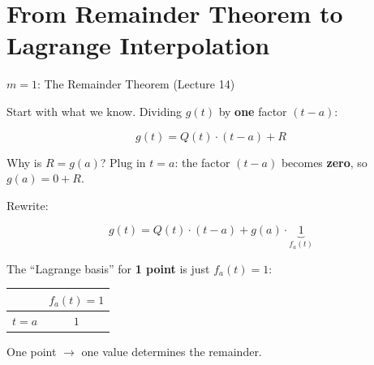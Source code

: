 \documentclass[10pt]{beamer}
\theoremstyle{definition}
\newcommand{\x}[1]{\alert{\textbf{#1}}}
\begin{document}
\section{From Remainder Theorem to Lagrange Interpolation}


\begin{frame}{$m = 1$: The Remainder Theorem (Lecture 14)}

Start with what we know. Dividing $g(t)$ by \x{one} factor $(t - a)$:

$$g(t) = Q(t)\cdot(t - a) + R$$

\vfill

Why is $R = g(a)$? \; Plug in $t = a$: the factor $(t-a)$ becomes \x{zero}, so $g(a) = 0 + R$.

\vfill\pause

Rewrite:

$$g(t) = Q(t)\cdot(t - a) + g(a) \cdot \underbrace{1}_{f_a(t)}$$

\vfill

The ``Lagrange basis'' for \x{1 point} is just $f_a(t) = 1$:

\begin{center}
\renewcommand{\arraystretch}{1.3}
\begin{tabular}{c|c}
 & $f_a(t) = 1$ \\
\hline
$t = a$ & $1$
\end{tabular}
\end{center}

\vfill

One point $\to$ one value determines the remainder.

\end{frame}
\end{document}
